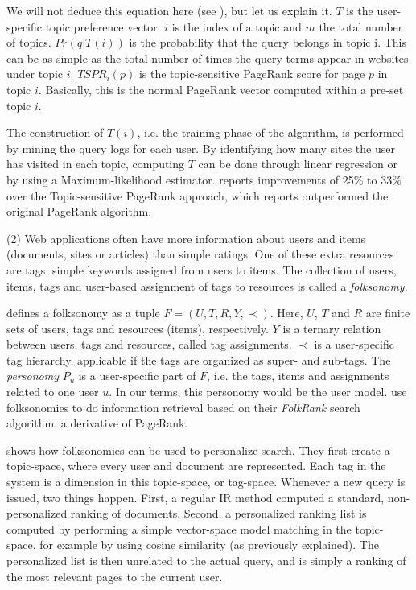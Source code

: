 We will not deduce this equation here (see \citet[p5]{Qiu2006}), but let us explain it. 
$T$ is the user-specific topic preference vector.
$i$ is the index of a topic and $m$ the total number of topics.
$Pr(q|T(i))$ is the probability that the query belongs in topic i.
This can be as simple as the total number of times the query terms appear in websites under topic $i$.
$TSPR_i(p)$ is the topic-sensitive PageRank score for page $p$ in topic $i$. Basically, this is 
the normal PageRank vector computed within a pre-set topic $i$.

The construction of $T(i)$, i.e. the training phase of the algorithm, is performed by mining the query logs for each user.
By identifying how many sites the user has visited in each topic, computing $T$ can be done through linear regression or
by using a Maximum-likelihood estimator.
\citet[p10]{Qiu2006} reports improvements of 25\% to 33\% over the Topic-sensitive PageRank approach, which 
\citet{Haveliwala2003} reports outperformed the original PageRank algorithm.


(2) Web applications often have more information about users and items (documents, sites or articles) 
than simple ratings. One of these extra resources are tags, simple keywords assigned from users to items. 
The collection of users, items, tags and user-based assignment of tags to resources is called a \emph{folksonomy}.

\cite{Hotho} defines a folksonomy as a tuple $F = (U,T,R,Y,\prec)$. 
Here, $U$, $T$ and $R$ are finite sets of users, tags and resources (items), respectively. 
$Y$ is a ternary relation between users, tags and resources, called tag assignments. 
$\prec$ is a user-specific tag hierarchy, applicable if the tags are organized as super- and sub-tags. 
The \emph{personomy} $P_u$ is a user-specific part of $F$, 
i.e. the tags, items and assignments related to one user $u$. 
In our terms, this personomy would be the user model. 
\citeauthor{Hotho} use folksonomies to do information retrieval based on their 
\emph{FolkRank} search algorithm, a derivative of PageRank. 

\cite{Bao2007} shows how folksonomies can be used to personalize search.
They first create a topic-space, where every user and document are represented.
Each tag in the system is a dimension in this topic-space, or tag-space.
Whenever a new query is issued, two things happen. First, a regular IR method
computed a standard, non-personalized ranking of documents.
Second, a personalized ranking list is computed by performing a simple
vector-space model matching in the topic-space, for example by using
cosine similarity (as previously explained). The personalized list
is then unrelated to the actual query, and is simply a ranking of the
most relevant pages to the current user.

